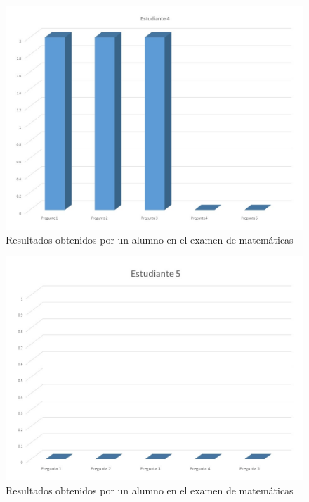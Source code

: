 \documentclass[12pt] {report}
\begin{document}
\begin{figure}[H]
\centering 
\includegraphics[scale=.4]{MEstudiante4.JPG}
\caption{Resultados obtenidos por un alumno en el examen de matemáticas}
\end{figure}
\begin{figure}[H]
\centering 
\includegraphics[scale=.4]{MEstudiante5.JPG}
\caption{Resultados obtenidos por un alumno en el examen de matemáticas}
\end{figure}
\end{document}
